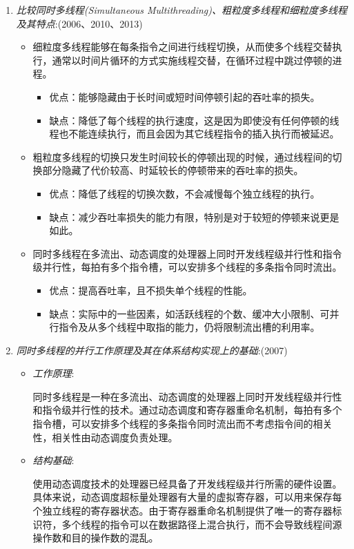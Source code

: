 \documentclass[a4paper]{ctexbook}
\begin{document}
\begin{enumerate}
  \item \emph{比较同时多线程(Simultaneous Multithreading)、粗粒度多线程和细粒度多线程及其特点}:(2006、2010、2013)
  \begin{itemize}
    \item 细粒度多线程能够在每条指令之间进行线程切换，从而使多个线程交替执行，通常以时间片循环的方式实施线程交替，在循环过程中跳过停顿的进程。
    \begin{itemize}
      \item 优点：能够隐藏由于长时间或短时间停顿引起的吞吐率的损失。
      \item 缺点：降低了每个线程的执行速度，这是因为即使没有任何停顿的线程也不能连续执行，而且会因为其它线程指令的插入执行而被延迟。
    \end{itemize}
    \item 粗粒度多线程的切换只发生时间较长的停顿出现的时候，通过线程间的切换部分隐藏了代价较高、时延较长的停顿带来的吞吐率的损失。
    \begin{itemize}
      \item 优点：降低了线程的切换次数，不会减慢每个独立线程的执行。
      \item 缺点：减少吞吐率损失的能力有限，特别是对于较短的停顿来说更是如此。
    \end{itemize}
    \item 同时多线程在多流出、动态调度的处理器上同时开发线程级并行性和指令级并行性，每拍有多个指令槽，可以安排多个线程的多条指令同时流出。
    \begin{itemize}
      \item 优点：提高吞吐率，且不损失单个线程的性能。
      \item 缺点：实际中的一些因素，如活跃线程的个数、缓冲大小限制、可并行指令及从多个线程中取指的能力，仍将限制流出槽的利用率。
    \end{itemize}
  \end{itemize}
  
  \item \emph{同时多线程的并行工作原理及其在体系结构实现上的基础}:(2007)
  \begin{itemize}
    \item \emph{工作原理}:
    
    同时多线程是一种在多流出、动态调度的处理器上同时开发线程级并行性和指令级并行性的技术。通过动态调度和寄存器重命名机制，每拍有多个指令槽，可以安排多个线程的多条指令同时流出而不考虑指令间的相关性，相关性由动态调度负责处理。
    \item \emph{结构基础}:
    
    使用动态调度技术的处理器已经具备了开发线程级并行所需的硬件设置。具体来说，动态调度超标量处理器有大量的虚拟寄存器，可以用来保存每个独立线程的寄存器状态。由于寄存器重命名机制提供了唯一的寄存器标识符，多个线程的指令可以在数据路径上混合执行，而不会导致线程间源操作数和目的操作数的混乱。
  

\end{itemize}
\end{enumerate}
\end{document}
